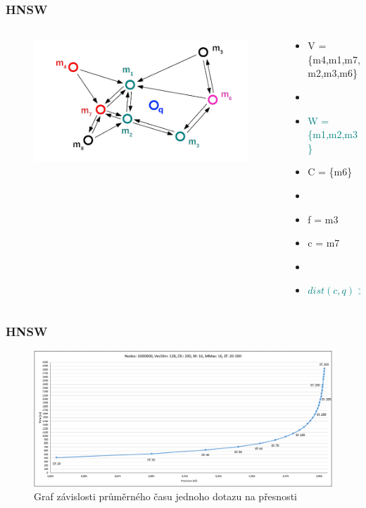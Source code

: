\documentclass{beamer}
\begin{document}
	\begin{frame}
		\frametitle{HNSW}
		\begin{columns}[T] %
			\begin{column}{.6\textwidth}
				\begin{figure}
					\includegraphics[scale=0.3]{figures/HNSW_b12.png}
				\end{figure}
			\end{column}%
			\hfill%
			\begin{column}{.4\textwidth}
				\begin{itemize}
					\item V = \{m4,m1,m7,m2,m3,m6\}
					\item[]
					\item \textcolor{teal}{W = \{m1,m2,m3\}}
					\item C = \{m6\}
					\item[]
					\item f = m3
					\item c = m7
					\item[]
					\item \textcolor{teal}{$dist(c,q) > dist(f,q)$}
				\end{itemize}
			\end{column}%
		\end{columns}
	\end{frame}
	
	\begin{frame}
		\frametitle{HNSW}
		
		\begin{figure}
			\includegraphics[scale=0.34]{figures/graf_hnsw.png}
			\caption{Graf závislosti průměrného času jednoho dotazu na přesnosti}
		\end{figure}
		
	\end{frame}
	
\end{document}
